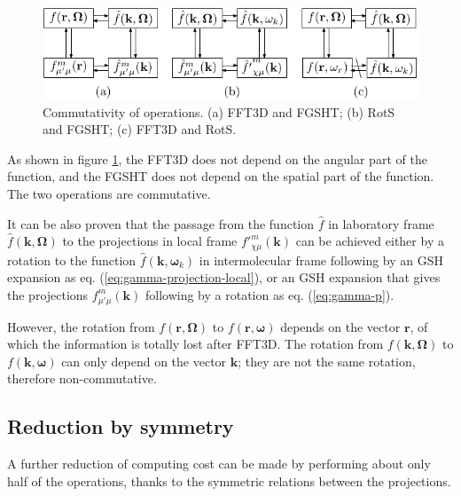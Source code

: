 \begin{figure}[h]
\begin{centering}
\includegraphics{_figure/algorithms_commutativity}
\par\end{centering}
\caption[Commutativity of operations]{Commutativity of operations. (a) FFT3D and FGSHT; (b) RotS and FGSHT;
(c) FFT3D and RotS.\label{fig:Commutativity-of-operations}}
\end{figure}

As shown in figure \ref{fig:Commutativity-of-operations}, the \acs{FFT}3D
does not depend on the angular part of the function, and the \acs{FGSHT}
does not depend on the spatial part of the function. The two operations
are commutative. 

It can be also proven that the passage from the function $\hat{f}$
in laboratory frame $\hat{f}(\mathbf{k},\mathbf{\Omega})$ to the
projections in local frame ${f'}_{\chi\mu}^{m}(\mathbf{k})$ can be
achieved either by a rotation to the function $\hat{f}(\mathbf{k},\boldsymbol{\omega}_{k})$
in intermolecular frame following by an \acs{GSH} expansion as eq.
(\ref{eq:gamma-projection-local}), or an \acs{GSH} expansion that
gives the projections $f_{\mu'\mu}^{m}(\mathbf{k})$ following by
a rotation as eq. (\ref{eq:gamma-p}).

However, the rotation from $f(\mathbf{r},\mathbf{\Omega})$ to $f(\mathbf{r},\boldsymbol{\omega})$
depends on the vector $\mathbf{r}$, of which the information is totally
lost after \acs{FFT}3D. The rotation from $f(\mathbf{k},\mathbf{\Omega})$
to $f(\mathbf{k},\boldsymbol{\omega})$ can only depend on the vector
$\mathbf{k}$; they are not the same rotation, therefore non-commutative. 

\subsection{Reduction by symmetry\label{subsec:Reduction-by-symmetry}}

A further reduction of computing cost can be made by performing about
only half of the operations, thanks to the symmetric relations between
the projections.

